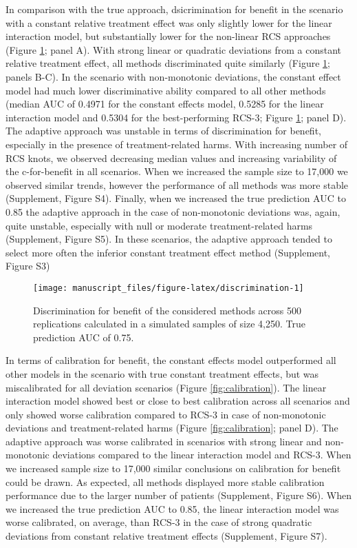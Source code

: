 \documentclass[]{elsarticle} %
\begin{document}
In comparison with the true approach, dsicrimination for benefit in the
scenario with a constant relative treatment effect was only slightly
lower for the linear interaction model, but substantially lower for the
non-linear RCS approaches (Figure \ref{fig:discrimination}; panel A).
With strong linear or quadratic deviations from a constant relative
treatment effect, all methods discriminated quite similarly (Figure
\ref{fig:discrimination}; panels B-C). In the scenario with
non-monotonic deviations, the constant effect model had much lower
discriminative ability compared to all other methods (median AUC of
0.4971 for the constant effects model, 0.5285 for the linear interaction
model and 0.5304 for the best-performing RCS-3; Figure
\ref{fig:discrimination}; panel D). The adaptive approach was unstable
in terms of discrimination for benefit, especially in the presence of
treatment-related harms. With increasing number of RCS knots, we
observed decreasing median values and increasing variability of the
c-for-benefit in all scenarios. When we increased the sample size to
17,000 we observed similar trends, however the performance of all
methods was more stable (Supplement, Figure S4). Finally, when we
increased the true prediction AUC to 0.85 the adaptive approach in the
case of non-monotonic deviations was, again, quite unstable, especially
with null or moderate treatment-related harms (Supplement, Figure S5).
In these scenarios, the adaptive approach tended to select more often
the inferior constant treatment effect method (Supplement, Figure S3)

\begin{figure}
\texttt{[image: manuscript\_files/figure-latex/discrimination-1]} \caption{Discrimination for benefit of the considered methods across 500 replications calculated in a simulated samples of size 4,250. True prediction AUC of 0.75.}\label{fig:discrimination}
\end{figure}

In terms of calibration for benefit, the constant effects model
outperformed all other models in the scenario with true constant
treatment effects, but was miscalibrated for all deviation scenarios
(Figure \ref{fig:calibration}). The linear interaction model showed best
or close to best calibration across all scenarios and only showed worse
calibration compared to RCS-3 in case of non-monotonic deviations and
treatment-related harms (Figure \ref{fig:calibration}; panel D). The
adaptive approach was worse calibrated in scenarios with strong linear
and non-monotonic deviations compared to the linear interaction model
and RCS-3. When we increased sample size to 17,000 similar conclusions
on calibration for benefit could be drawn. As expected, all methods
displayed more stable calibration performance due to the larger number
of patients (Supplement, Figure S6). When we increased the true
prediction AUC to 0.85, the linear interaction model was worse
calibrated, on average, than RCS-3 in the case of strong quadratic
deviations from constant relative treatment effects (Supplement, Figure
S7).
\end{document}
